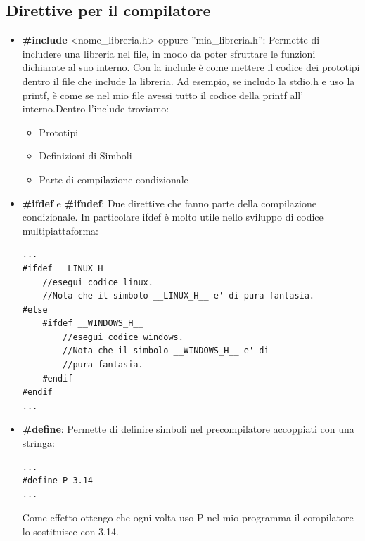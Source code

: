\documentclass[a4paper,12pt]{article} %
\begin{document}
\subsection{Direttive per il compilatore}
\begin{itemize}
\item \textbf{\#include} <nome\_libreria.h> oppure ''mia\_libreria.h'': Permette di includere una libreria nel file, in modo da poter sfruttare le funzioni dichiarate al suo interno. Con la include è come mettere il codice dei prototipi dentro il file che include la libreria. Ad esempio, se includo la stdio.h e uso la printf, è come se nel mio file avessi tutto il codice della printf all' interno.Dentro l'include troviamo:
\begin{itemize}
\item Prototipi
\item Definizioni di Simboli
\item Parte di compilazione condizionale
\end{itemize}
\item \textbf{\#ifdef} e \textbf{\#ifndef}: Due direttive che fanno parte della compilazione condizionale. In particolare ifdef è molto utile nello sviluppo di codice multipiattaforma:
\begin{lstlisting}
...
#ifdef __LINUX_H__
	//esegui codice linux.
	//Nota che il simbolo __LINUX_H__ e' di pura fantasia.
#else
	#ifdef __WINDOWS_H__
		//esegui codice windows.
		//Nota che il simbolo __WINDOWS_H__ e' di 
		//pura fantasia.
	#endif
#endif
...
\end{lstlisting}

\item \textbf{\#define}: Permette di definire simboli nel precompilatore accoppiati con una stringa:
\begin{lstlisting}
...
#define P 3.14
...
\end{lstlisting}
Come effetto ottengo che ogni volta uso P nel mio programma il compilatore lo sostituisce con 3.14.
\end{itemize}
\end{document}
